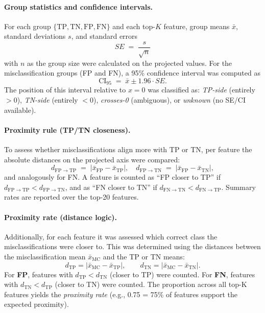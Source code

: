 \paragraph{Group statistics and confidence intervals.}
For each group $\{\mathrm{TP}, \mathrm{TN}, \mathrm{FP}, \mathrm{FN}\}$ and each top-$K$ feature, group means $\bar{x}$, standard deviations $s$, and standard errors
\[
SE \;=\; \frac{s}{\sqrt{n}}
\]
with $n$ as the group size were calculated on the projected values. For the misclassification groups (FP and FN), a 95\% confidence interval was computed as
\[
\mathrm{CI}_{95} \;=\; \bar{x} \pm 1.96 \cdot SE.
\]
The position of this interval relative to $x=0$ was classified as:
\emph{TP-side} (entirely $>0$), \emph{TN-side} (entirely $<0$), \emph{crosses-0} (ambiguous), or \emph{unknown} (no SE/CI available).

\paragraph{Proximity rule (TP/TN closeness).}
To assess whether misclassifications align more with TP or TN, per feature the absolute distances on the projected axis were compared:
\[
d_{\mathrm{FP}\to\mathrm{TP}} \;=\; \bigl|\bar{x}_{\mathrm{FP}} - \bar{x}_{\mathrm{TP}}\bigr|,\quad
d_{\mathrm{FP}\to\mathrm{TN}} \;=\; \bigl|\bar{x}_{\mathrm{FP}} - \bar{x}_{\mathrm{TN}}\bigr|,
\]
and analogously for FN. A feature is counted as “FP closer to TP” if $d_{\mathrm{FP}\to\mathrm{TP}} < d_{\mathrm{FP}\to\mathrm{TN}}$, and as “FN closer to TN” if $d_{\mathrm{FN}\to\mathrm{TN}} < d_{\mathrm{FN}\to\mathrm{TP}}$. Summary rates are reported over the top-20 features. 


\paragraph{Proximity rate (distance logic).}
Additionally, for each feature it was assessed which correct class the misclassifications were closer to. This was determined using the distances between the misclassification mean \(\bar{x}_{\mathrm{MC}}\) and the TP or TN means:
\[
d_{\mathrm{TP}} = \lvert \bar{x}_{\mathrm{MC}} - \bar{x}_{\mathrm{TP}} \rvert, \qquad
d_{\mathrm{TN}} = \lvert \bar{x}_{\mathrm{MC}} - \bar{x}_{\mathrm{TN}} \rvert.
\]
For \textbf{FP}, features with \(d_{\mathrm{TP}} < d_{\mathrm{TN}}\) (closer to TP) were counted. For \textbf{FN}, features with \(d_{\mathrm{TN}} < d_{\mathrm{TP}}\) (closer to TN) were counted. The proportion across all top-K features yields the \emph{proximity rate} (e.g., 0.75 = 75\% of features support the expected proximity).

